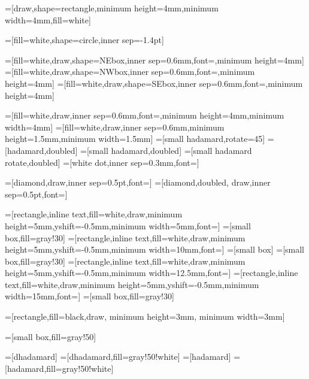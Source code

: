 
=[draw,shape=rectangle,minimum height=4mm,minimum width=4mm,fill=white]

=[fill=white,shape=circle,inner sep=-1.4pt]

=[fill=white,draw,shape=NEbox,inner sep=0.6mm,font=\footnotesize,minimum height=4mm]
=[fill=white,draw,shape=NWbox,inner sep=0.6mm,font=\footnotesize,minimum height=4mm]
=[fill=white,draw,shape=SEbox,inner sep=0.6mm,font=\footnotesize,minimum height=4mm]


=[fill=white,draw,inner sep=0.6mm,font=\footnotesize,minimum height=4mm,minimum width=4mm]
=[fill=white,draw,inner sep=0.6mm,minimum height=1.5mm,minimum width=1.5mm]
=[small hadamard,rotate=45]
=[hadamard,doubled]
=[small hadamard,doubled]
=[small hadamard rotate,doubled]
=[white dot,inner sep=0.3mm,font=\footnotesize]

=[diamond,draw,inner sep=0.5pt,font=\small]
=[diamond,doubled, draw,inner sep=0.5pt,font=\small]

=[rectangle,inline text,fill=white,draw,minimum height=5mm,yshift=-0.5mm,minimum width=5mm,font=\small]
=[small box,fill=gray!30]
=[rectangle,inline text,fill=white,draw,minimum height=5mm,yshift=-0.5mm,minimum width=10mm,font=\small]
=[small box] %
=[small box,fill=gray!30]
=[rectangle,inline text,fill=white,draw,minimum height=5mm,yshift=-0.5mm,minimum width=12.5mm,font=\small]
=[rectangle,inline text,fill=white,draw,minimum height=5mm,yshift=-0.5mm,minimum width=15mm,font=\small]
=[small box,fill=gray!30]

=[rectangle,fill=black,draw, minimum height=3mm, minimum width=3mm]

=[small box,fill=gray!50]

=[dhadamard]
=[dhadamard,fill=gray!50!white]
=[hadamard]
=[hadamard,fill=gray!50!white]

